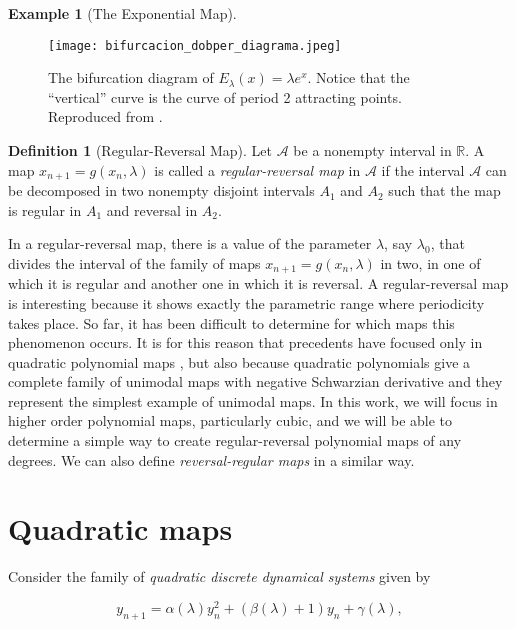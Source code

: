 \documentclass[10pt,twoside,titlepage]{book}
\numberwithin{equation}{chapter}
\numberwithin{figure}{chapter}
\numberwithin{table}{chapter}
\theoremstyle{plain}%
\theoremstyle{definition}
\newtheorem{defn}{Definition}[chapter]
\newtheorem{example}{Example}[chapter]
\theoremstyle{remark}
\begin{document}
\begin{example}[The Exponential Map]
	\begin{figure}
		\centering
		\texttt{[image: bifurcacion\_dobper\_diagrama.jpeg]}
		\caption{The bifurcation diagram of $E_{\lambda}(x)=\lambda e^x$. Notice that the ``vertical'' curve is the curve of period 2 attracting points. Reproduced from \cite{DevaneyIntroCDD}.}
		\label{fig:reversemap3}
	\end{figure}
\end{example}

\begin{defn}[Regular-Reversal Map]
	\label{def:regular-reversal}
	Let $\mathcal{A}$ be a nonempty interval in $\mathbb{R}$. A map $x_{n+1}=g(x_{n},\lambda)$ is called a \emph{regular-reversal map} in $\mathcal{A}$ if the interval $\mathcal{A}$ can be decomposed in two nonempty disjoint intervals $A_{1}$ and $A_{2}$ such that the map is regular in $A_{1}$ and reversal in $A_{2}$.
\end{defn}

In a regular-reversal map, there is a value of the parameter $\lambda$, say $\lambda_{0}$, that divides the interval of the family of maps $x_{n+1}=g(x_{n},\lambda)$ in two, in one of which it is regular and another one in which it is reversal. A regular-reversal map is interesting because it shows exactly the parametric range where periodicity takes place. So far, it has been difficult to determine for which maps this phenomenon occurs. It is for this reason that precedents have focused only in quadratic polynomial maps \cite{Solis2004}, but also because quadratic polynomials give a complete family of unimodal maps with negative Schwarzian derivative and they represent the simplest example of unimodal maps. In this work, we will focus in higher order polynomial maps, particularly cubic, and we will be able to determine a simple way to create regular-reversal polynomial maps of any degrees. We can also define \emph{reversal-regular maps} in a similar way.

\section{Quadratic maps}

Consider the family of \emph{quadratic discrete dynamical systems} given by

\begin{equation}
	y_{n+1}=\alpha(\lambda)y_{n}^{2}+(\beta(\lambda)+1)y_{n}+\gamma(\lambda),
	\label{eq:QuadraticFamilyGeneral}
\end{equation}
\end{document}
